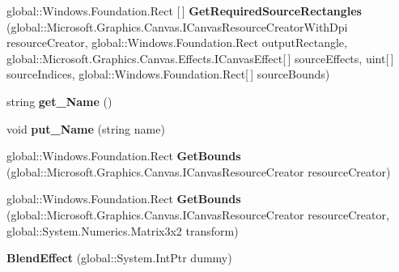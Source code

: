 \begin{DoxyCompactItemize}
\mbox{\label{class_microsoft_1_1_graphics_1_1_canvas_1_1_effects_1_1_blend_effect_ab569b0bbd75fda084b9b5bdaa67e0435}} 
global\+::\+Windows.\+Foundation.\+Rect \mbox{[}$\,$\mbox{]} {\bfseries Get\+Required\+Source\+Rectangles} (global\+::\+Microsoft.\+Graphics.\+Canvas.\+I\+Canvas\+Resource\+Creator\+With\+Dpi resource\+Creator, global\+::\+Windows.\+Foundation.\+Rect output\+Rectangle, global\+::\+Microsoft.\+Graphics.\+Canvas.\+Effects.\+I\+Canvas\+Effect\mbox{[}$\,$\mbox{]} source\+Effects, uint\mbox{[}$\,$\mbox{]} source\+Indices, global\+::\+Windows.\+Foundation.\+Rect\mbox{[}$\,$\mbox{]} source\+Bounds)
\item 
\mbox{\label{class_microsoft_1_1_graphics_1_1_canvas_1_1_effects_1_1_blend_effect_ae6a348ba6554e025e0079757f11fc876}} 
string {\bfseries get\+\_\+\+Name} ()
\item 
\mbox{\label{class_microsoft_1_1_graphics_1_1_canvas_1_1_effects_1_1_blend_effect_a1a62a28a8ed5733d966ad494c3936511}} 
void {\bfseries put\+\_\+\+Name} (string name)
\item 
\mbox{\label{class_microsoft_1_1_graphics_1_1_canvas_1_1_effects_1_1_blend_effect_a7a22f733debb5fcc64e20a7ef9d6c633}} 
global\+::\+Windows.\+Foundation.\+Rect {\bfseries Get\+Bounds} (global\+::\+Microsoft.\+Graphics.\+Canvas.\+I\+Canvas\+Resource\+Creator resource\+Creator)
\item 
\mbox{\label{class_microsoft_1_1_graphics_1_1_canvas_1_1_effects_1_1_blend_effect_aeaac7a44c02206f0c747d639ddf8c73a}} 
global\+::\+Windows.\+Foundation.\+Rect {\bfseries Get\+Bounds} (global\+::\+Microsoft.\+Graphics.\+Canvas.\+I\+Canvas\+Resource\+Creator resource\+Creator, global\+::\+System.\+Numerics.\+Matrix3x2 transform)
\item 
\mbox{\label{class_microsoft_1_1_graphics_1_1_canvas_1_1_effects_1_1_blend_effect_aacace451098126cd26608dce234e9905}} 
{\bfseries Blend\+Effect} (global\+::\+System.\+Int\+Ptr dummy)

\end{DoxyCompactItemize}
